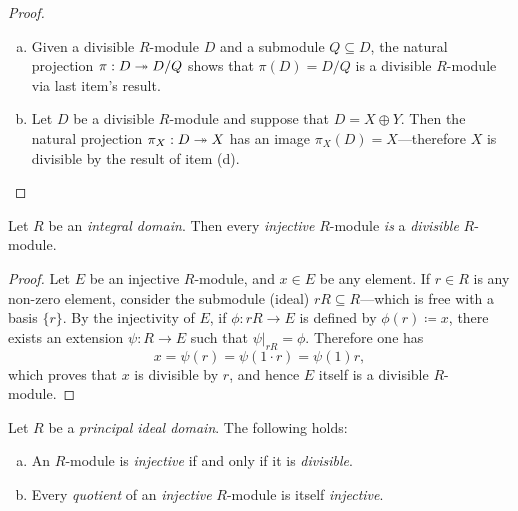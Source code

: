 \begin{proof}
\begin{enumerate}[(a)]
\item Given a divisible \(R\)-module \(D\) and a submodule \(Q \subseteq D\),
  the natural projection \(\pi: D \twoheadrightarrow D/Q\) shows that \(\pi(D) = D/Q\) is a
  divisible \(R\)-module via last item's result.

\item Let \(D\) be a divisible \(R\)-module and suppose that \(D = X \oplus
  Y\). Then the natural projection \(\pi_X: D \twoheadrightarrow X\) has an image \(\pi_X(D) =
  X\)---therefore \(X\) is divisible by the result of item (d).
\end{enumerate}
\end{proof}

\begin{proposition}
\label{prop:int-domain-injective-mod-is-divisible}
Let \(R\) be an \emph{integral domain}. Then every \emph{injective} \(R\)-module
\emph{is} a \emph{divisible} \(R\)-module.
\end{proposition}

\begin{proof}
Let \(E\) be an injective \(R\)-module, and \(x \in E\) be any element. If
\(r \in R\) is any non-zero element, consider the submodule (ideal)
\(r R \subseteq R\)---which is free with a basis \(\{r\}\). By the injectivity
of \(E\), if \(\phi: r R \to E\) is defined by \(\phi(r) \coloneq x\), there
exists an extension \(\psi: R \to E\) such that \(\psi|_{r R} =
\phi\). Therefore one has
\[
x = \psi(r) = \psi(1 \cdot r) = \psi(1) r,
\]
which proves that \(x\) is divisible by \(r\), and hence \(E\) itself is a
divisible \(R\)-module.
\end{proof}

\begin{proposition}
\label{prop:int-dom-PID-divisible-module-iff-injective-and-quotient}
Let \(R\) be a \emph{principal ideal domain}. The following holds:
\begin{enumerate}[(a)]\setlength\itemsep{0em}
\item An \(R\)-module is \emph{injective} if and only if it is
  \emph{divisible}.

\item Every \emph{quotient} of an \emph{injective} \(R\)-module is itself
  \emph{injective}.
\end{enumerate}
\end{proposition}


